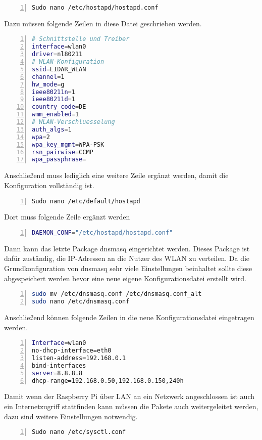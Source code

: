 \begin{lstlisting}[caption={Konfiguration Hostapd}, language={bash}, numbers=left]
Sudo nano /etc/hostapd/hostapd.conf
\end{lstlisting}
Dazu müssen folgende Zeilen in diese Datei geschrieben werden.
\begin{lstlisting}[caption={Konfiguration Hostapd}, language={bash}, numbers=left]
# Schnittstelle und Treiber
interface=wlan0
driver=nl80211
# WLAN-Konfiguration
ssid=LIDAR_WLAN
channel=1
hw_mode=g
ieee80211n=1
ieee80211d=1
country_code=DE
wmm_enabled=1
# WLAN-Verschluesselung
auth_algs=1
wpa=2
wpa_key_mgmt=WPA-PSK
rsn_pairwise=CCMP
wpa_passphrase=
\end{lstlisting}
Anschließend muss lediglich eine weitere Zeile ergänzt werden, damit die Konfiguration vollständig ist.
\begin{lstlisting}[caption={Konfiguration Hostapd}, language={bash}, numbers=left]
Sudo nano /etc/default/hostapd
\end{lstlisting}
Dort muss folgende Zeile ergänzt werden
\begin{lstlisting}[caption={Konfiguration Hostapd}, language={bash}, numbers=left]
DAEMON_CONF="/etc/hostapd/hostapd.conf"
\end{lstlisting}
Dann kann das letzte Package dnsmasq eingerichtet werden. Dieses Package ist dafür zuständig, die \ac{IP}-Adressen an die Nutzer des \ac{WLAN} zu verteilen.
Da die Grundkonfiguration von dnsmasq sehr viele Einstellungen beinhaltet sollte diese abgespeichert werden bevor eine neue eigene Konfigurationsdatei erstellt wird.
\begin{lstlisting}[caption={Konfiguration dnsmasq}, language={bash}, numbers=left]
sudo mv /etc/dnsmasq.conf /etc/dnsmasq.conf_alt
sudo nano /etc/dnsmasq.conf
\end{lstlisting}
Anschließend können folgende Zeilen in die neue Konfigurationsdatei eingetragen werden.
\begin{lstlisting}[caption={Konfiguration dnsmasq}, language={bash}, numbers=left]
Interface=wlan0
no-dhcp-interface=eth0
listen-address=192.168.0.1
bind-interfaces
server=8.8.8.8
dhcp-range=192.168.0.50,192.168.0.150,240h
\end{lstlisting}
Damit wenn der Raspberry Pi über \ac{LAN} an ein Netzwerk angeschlossen ist auch ein Internetzugriff stattfinden kann müssen die Pakete auch weitergeleitet werden, dazu sind weitere Einstellungen notwendig.
\begin{lstlisting}[caption={Konfiguration IPV4}, language={bash}, numbers=left]
Sudo nano /etc/sysctl.conf
\end{lstlisting}
